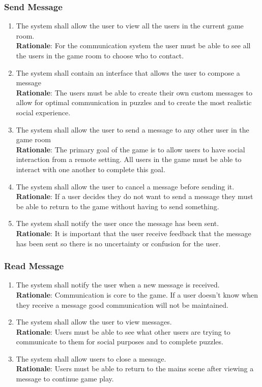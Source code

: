 \documentclass[12pt]{article}
\begin{document}
\subsubsection{Send Message}
    \begin{enumerate}[label=SM\arabic*., series=Send Message]
        \item The system shall allow the user to view all the users in the current game room.\\
        \textbf{Rationale}: For the communication system the user must be able to see all the users in the game room to choose who to contact.
        \item The system shall contain an interface that allows the user to compose a message\\
        \textbf{Rationale}: The users must be able to create their own custom messages to allow for optimal communication in puzzles and to create the most realistic social experience.
        \item The system shall allow the user to send a message to any other user in the game room\\
        \textbf{Rationale}: The primary goal of the game is to allow users to have social interaction from a remote setting. All users in the game must be able to interact with one another to complete this goal.
        \item The system shall allow the user to cancel a message before sending it.\\
        \textbf{Rationale}: If a user decides they do not want to send a message they must be able to return to the game without having to send something.
        \item The system shall notify the user once the message has been sent.\\
        \textbf{Rationale}: It is important that the user receive feedback that the message has been sent so there is no uncertainty or confusion for the user.
    \end{enumerate}
\subsubsection{Read Message}
    \begin{enumerate}[label=RM\arabic*., series=ReadMessage]
        \item The system shall notify the user when a new message is received.\\
        \textbf{Rationale}: Communication is core to the game. If a user doesn't know when they receive a message good communication will not be maintained.
        \item The system shall allow the user to view messages.\\
        \textbf{Rationale}: Users must be able to see what other users are trying to communicate to them for social purposes and to complete puzzles.
        \item The system shall allow users to close a message.\\
        \textbf{Rationale}: Users must be able to return to the mains scene after viewing a message to continue game play.
    \end{enumerate}
\end{document}
